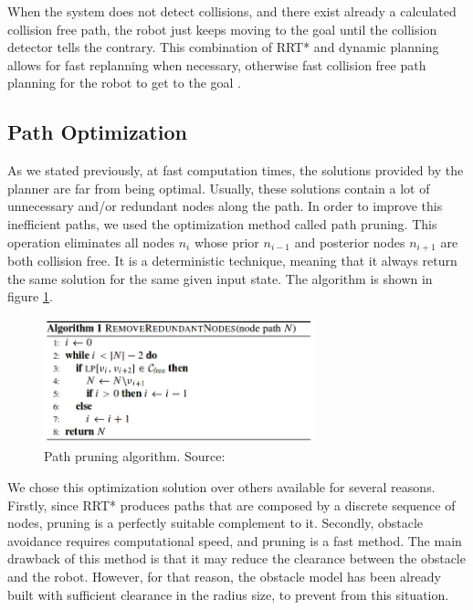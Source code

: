 When the system does not detect collisions, and there exist already a calculated collision free path, the robot just keeps moving to the goal until the collision detector tells the contrary. This combination of RRT* and dynamic planning allows for fast replanning when necessary, otherwise fast collision free path planning for the robot to get to the goal \cite{connell}. \\

\subsection{Path Optimization}
\label{sec:opt}

As we stated previously, at fast computation times, the solutions provided by the planner are far from being optimal. Usually, these solutions contain a lot of unnecessary and/or redundant nodes along the path. In order to improve this inefficient paths, we used the optimization method called path pruning. This operation eliminates all nodes $n_{i}$ whose prior $n_{i-1}$ and posterior nodes $n_{i+1}$ are both collision free. It is a deterministic technique, meaning that it always return the same solution for the same given input state. The algorithm is shown in figure \ref{fig:prun}. \\

\begin{figure}[ht!]
    \centering
    \includegraphics[width=0.7\textwidth]{Images/plan/pruning.png}
    \caption{Path pruning algorithm. Source: \cite{optimization}}
    \label{fig:prun}
\end{figure}

We chose this optimization solution over others available for several reasons. Firstly, since RRT* produces paths that are composed by a discrete sequence of nodes, pruning is a perfectly suitable complement to it. Secondly, obstacle avoidance requires computational speed, and pruning is a fast method. The main drawback of this method is that it may reduce the clearance between the obstacle and the robot. However, for that reason, the obstacle model has been already built with sufficient clearance in the radius size, to prevent from this situation. \\
